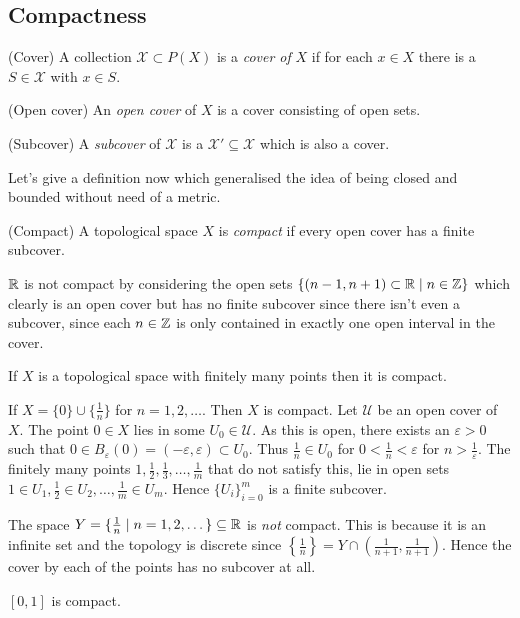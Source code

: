 \documentclass{article}
\begin{document}
\subsection{Compactness}
\begin{definition}
	(Cover) A collection $ \mathcal X\subset P(X) $ is a \textit{cover of} $ X $ if for each $ x\in X $ there is a $ S\in \mathcal X $ with $ x\in S $.
\end{definition}
\begin{definition}
	(Open cover) An \textit{open cover} of $ X $ is a cover consisting of open sets.
\end{definition}
\begin{definition}
	(Subcover) A \textit{subcover} of $ \mathcal X $ is a $ \mathcal X'\subseteq \mathcal X $ which is also a cover.
\end{definition}
Let's give a definition now which generalised the idea of being closed and bounded without need of a metric.
\begin{definition}
	(Compact) A topological space $ X $ is \textit{compact} if every open cover has a finite subcover.
\end{definition}
$ \mathbb{R} $ is not compact by considering the open sets $ \{(n-1,n+1) \subset \mathbb{R} \mid n\in \mathbb{Z} \} $ which clearly is an open cover but has no finite subcover since there isn't even a subcover, since each $ n\in \mathbb{Z} $ is only contained in exactly one open interval in the cover.\par
If $ X $ is a topological space with finitely many points then it is compact.
\par
If $ X = \{0\}\cup \{\frac 1n\} $ for $ n=1,2,\dots $. Then $ X $ is compact. Let $ \mathcal U $ be an open cover of $ X $. The point $ 0\in X $ lies in some $ U_0\in \mathcal U $. As this is open, there exists an $ \varepsilon>0 $ such that $ 0\in B_{\varepsilon}(0)=(-\varepsilon,\varepsilon)\subset U_0 $. Thus $ \frac 1n \in U_0 $ for $ 0<\frac 1n <\varepsilon $ for $ n>\frac 1\varepsilon $. The finitely many points $ 1,\frac 12, \frac 13,\dots, \frac 1m $ that do not satisfy this, lie in open sets $ 1\in U_1, \frac 12 \in U_2, \dots, \frac 1m \in U_m $. Hence $ \{U_i\}_{i=0}^m $ is a finite subcover.\par
The space $ Y = \{\frac 1n \mid n=1,2,\dots \}\subseteq \mathbb{R}$ is \textit{not} compact. This is because it is an infinite set and the topology is discrete since $ \left\{\frac 1n\right\} = Y\cap \left(\frac 1{n+1}, \frac 1{n+1}\right) $. Hence the cover by each of the points has no subcover at all.
\begin{theorem}
	$ [0,1] $ is compact.
\end{theorem}
\end{document}
